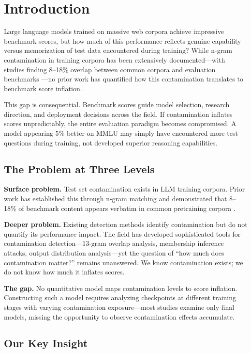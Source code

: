 \section{Introduction}

Large language models trained on massive web corpora achieve impressive benchmark scores, but how much of this performance reflects genuine capability versus memorization of test data encountered during training? While n-gram contamination in training corpora has been extensively documented---with studies finding 8--18\% overlap between common corpora and evaluation benchmarks \citep{yang2023rethinking}---no prior work has quantified how this contamination translates to benchmark score inflation.

This gap is consequential. Benchmark scores guide model selection, research direction, and deployment decisions across the field. If contamination inflates scores unpredictably, the entire evaluation paradigm becomes compromised. A model appearing 5\% better on MMLU may simply have encountered more test questions during training, not developed superior reasoning capabilities.

\subsection{The Problem at Three Levels}

\textbf{Surface problem.} Test set contamination exists in LLM training corpora. Prior work has established this through n-gram matching \citep{brown2020language} and demonstrated that 8--18\% of benchmark content appears verbatim in common pretraining corpora \citep{yang2023rethinking}.

\textbf{Deeper problem.} Existing detection methods identify contamination but do not quantify its performance impact. The field has developed sophisticated tools for contamination detection---13-gram overlap analysis, membership inference attacks, output distribution analysis---yet the question of ``how much does contamination matter?'' remains unanswered. We know contamination exists; we do not know how much it inflates scores.

\textbf{The gap.} No quantitative model maps contamination levels to score inflation. Constructing such a model requires analyzing checkpoints at different training stages with varying contamination exposure---most studies examine only final models, missing the opportunity to observe contamination effects accumulate.

\subsection{Our Key Insight}

